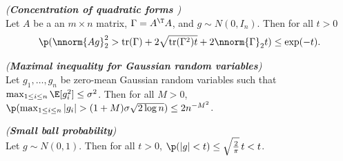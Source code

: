 \documentclass[11pt]{article}
\def\tr{\mathrm{tr}}
\begin{document}
\begin{lemma}\label{lem:hansonwright}\emph{(\textbf{Concentration of quadratic forms \cite{Hsu2012}})}\\
Let $A$ be a an $m \times n$ matrix, $\Gamma = A^{\T} A$, and $g \sim N(0, I_n)$. Then for all $t > 0$
\begin{equation*}
  \p(\nnorm{A g}_2^2  > \tr(\Gamma) + 2 \sqrt{\tr(\Gamma^2) t} + 2 \nnorm{\Gamma}_2 t) \leq \exp(-t). 
\end{equation*}
\end{lemma}


\begin{lemma}\label{lem:maximalgaussian}\emph{(\textbf{Maximal inequality for Gaussian random variables})}\\
Let $g_1, \ldots, g_n$ be zero-mean Gaussian random variables such that $\max_{1 \leq i \leq n} \E[g_i^2] \leq \sigma^2$. Then
for all $M > 0$, $\p(\max_{1 \leq i \leq n} |g_i| > (1+M) \sigma \sqrt{2 \log n}) \leq 2n^{-M^2}$. 
\end{lemma}


\begin{lemma}\label{lem:smallball} \emph{(\textbf{Small ball probability})}\\
Let $g \sim N(0,1)$. Then for all $t > 0$, $\p(|g| < t) \leq \sqrt{\frac{2}{\pi}} \, t < t$.  
\end{lemma}
\end{document}
